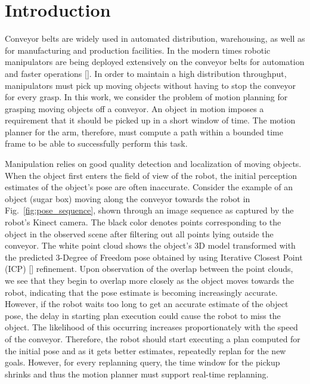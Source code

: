 \documentclass[conference]{IEEEtran}
\begin{document}
\IEEEpeerreviewmaketitle

\section{Introduction}

Conveyor belts are widely used in automated distribution, warehousing, as well as for manufacturing and production facilities. In the modern times robotic manipulators are being deployed extensively on the conveyor belts for automation and faster operations []. In order to maintain a high distribution throughput, manipulators must pick up moving objects without having to stop the conveyor for every grasp. In this work, we consider the problem of motion planning for grasping moving objects off a conveyor. An object in motion imposes a requirement that it should be picked up in a short window of time. The motion planner for the arm, therefore, must compute a path within a bounded time frame to be able to successfully perform this task.

Manipulation relies on good quality detection and localization of moving objects. When the object first enters the field of view of the robot, the initial perception estimates of the object's pose are often inaccurate. Consider the example of an object (sugar box) moving along the conveyor towards the robot in Fig.~\ref{fig:pose_sequence}, shown through an image sequence as captured by the robot's Kinect camera. The black color denotes points corresponding to the object in the observed scene after filtering out all points lying outside the conveyor. The white point cloud shows the object's 3D model transformed with the predicted 3-Degree of Freedom pose obtained by using Iterative Closest Point (ICP) [] refinement. Upon observation of the overlap between the point clouds, we see that they begin to overlap more closely as the object moves towards the robot, indicating that the pose estimate is becoming increasingly accurate. However, if the robot waits too long to get an accurate estimate of the object pose, the delay in starting plan execution could cause the robot to miss the object. The likelihood of this occurring increases proportionately with the speed of the conveyor. Therefore, the robot should start executing a plan computed for the initial pose and as it gets better estimates, repeatedly replan for the new goals. However, for every replanning query, the time window for the pickup shrinks and thus the motion planner must support real-time replanning.
\end{document}
